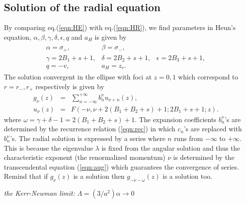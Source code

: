 \subsection{Solution of the radial equation} 

By comparing eq.(\ref{eqn:HE}) with eq.(\ref{eqn:HR}), we find 
parameters in Heun's equation, $\alpha, \beta, \gamma, 
\delta, \epsilon, q$ and $a_H$ is given by
%
\begin{eqnarray}
\label{eqn:Rexp}
\begin{array}{lll}
\alpha=\sigma_+,  & \beta=\sigma_-,  & \\
\gamma=2B_1+s+1, & \delta = 2B_2+s+1, & \epsilon = 2B_3+s+1, \\
q= -v, & a_H = z_r. &  
\end{array}
\end{eqnarray}
%
The solution convergent in the ellipse with foci at $z=0, 1$ which 
 correspond to 
$r=r_-, r_+$ respectively is given by 
%
\begin{eqnarray} g_\nu(z)&=&\sum_{n=-\infty}^{+\infty} b^\nu_n u_{\nu+n}(z), 
\label{eqn:gnu}\\ u_\nu(z)&=&F(-\nu,\nu+2(B_1+B_2+s)+1;2B_1+s+1;z).
\end{eqnarray}
%
where $\omega=\gamma+\delta-1=2(B_1+B_2+s)+1$. 
The expansion coefficients $b^\nu_n$'s are determined by the recurrence 
relation (\ref{eqn:rec}) in which $c_n$'s are replaced with $b^\nu_n$'s.
The radial solution is expressed by a series where $n$ runs from $-\infty$ 
to $+\infty$. 
This is because the eigenvalue $\lambda$ is fixed from 
the angular solution and thus the characteristic exponent 
(the renormalized momentum) $\nu$ is determined by the 
transcendental equation (\ref{eqn:aug}) which guarantees the 
convergence of series. Remind that if $g_{\nu}(z)$ is a solution 
then $g_{-\nu-\omega}(z)$ is a solution too. 

\noindent
{\it  the Kerr-Newman limit: $\Lambda=(3/a^2)\alpha 
\rightarrow 0$}

